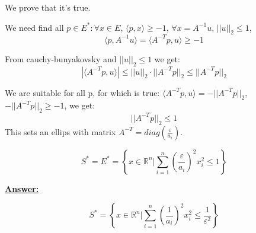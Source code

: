 We prove that it's true. 

We need find all $p \in E^* : \forall x \in E$, $\langle p, x \rangle \geq -1$, $\forall x = A^{-1}u$, $||u||_2 \leq 1$, 
\begin{equation*}
\langle p, A^{-1}u \rangle = \langle A^{-T}p, u \rangle \geq -1    
\end{equation*}

From cauchy-bunyakovsky and $||u||_2 \leq 1$ we get:
\begin{equation*}
    |\langle A^{-T}p, u \rangle|\leq ||u||_2 \cdot ||A^{-T}p||_2 \leq ||A^{-T}p||_2 
\end{equation*}

We are suitable for all p, for which is true: $\langle A^{-T}p, u \rangle = - ||A^{-T}p||_2$,
$-||A^{-T}p||_2 \geq -1$, we get:
\begin{equation*}
    ||A^{-T}p||_2 \leq 1
\end{equation*}
This sets an ellips with matrix $A^{-T} = diag(\frac{\varepsilon}{a_i})$.

\begin{equation*}
    S^* = E^* = \left\{ x \in \mathds{R}^n | \sum\limits_{i=1}^n (\frac{\varepsilon}{a_i})^2 x_i^2 \leq 1 \right\}
\end{equation*}

\underline{\textbf{Answer:}}

\begin{equation*}
    S^* = \left\{ x \in \mathds{R}^n | \sum\limits_{i=1}^n (\frac{1}{a_i})^2 x_i^2 \leq \frac{1}{\varepsilon^2} \right\}
\end{equation*}